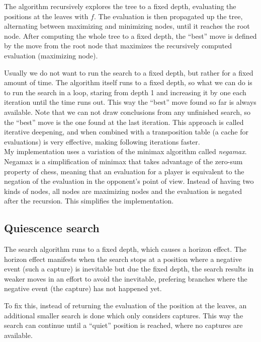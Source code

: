 The algorithm recursively explores the tree to a fixed depth, evaluating the positions at the leaves with $f$. The evaluation is then propagated up the tree, alternating between maximizing and minimizing nodes, until it reaches the root node. After computing the whole tree to a fixed depth, the \enquote{best} move is defined by the move from the root node that maximizes the recursively computed evaluation (maximizing node).

Usually we do not want to run the search to a fixed depth, but rather for a fixed amount of time. The algorithm itself runs to a fixed depth, so what we can do is to run the search in a loop, staring from depth 1 and increasing it by one each iteration until the time runs out. This way the \enquote{best} move found so far is always available. Note that we can not draw conclusions from any unfinished search, so the \enquote{best} move is the one found at the last iteration. This approach is called iterative deepening, and when combined with a transposition table (a cache for evaluations) is very effective, making following iterations faster. \\

My implementation uses a variation of the minimax algorithm called \textit{negamax}. Negamax is a simplification of minimax that takes advantage of the zero-sum property of chess, meaning that an evaluation for a player is equivalent to the negation of the evaluation in the opponent's point of view. Instead of having two kinds of nodes, all nodes are maximizing nodes and the evaluation is negated after the recursion. This simplifies the implementation.

\subsection{Quiescence search}

The search algorithm runs to a fixed depth, which causes a horizon effect. The horizon effect manifests when the search stops at a position where a negative event (such a capture) is inevitable but due the fixed depth, the search results in weaker moves in an effort to avoid the inevitable, prefering branches where the negative event (the capture) has not happened yet.

To fix this, instead of returning the evaluation of the position at the leaves, an additional smaller search is done which only considers captures. This way the search can continue until a \enquote{quiet} position is reached, where no captures are available.

